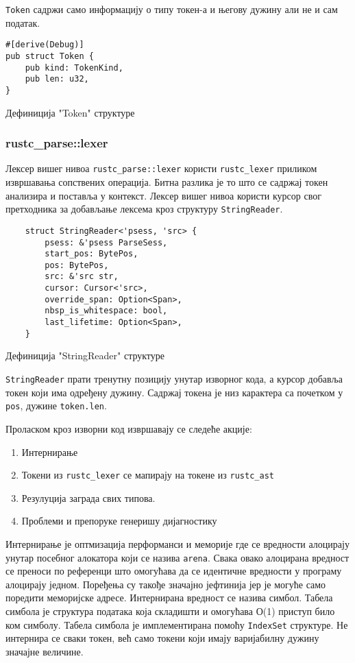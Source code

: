 \verb|Token| садржи само информацију о типу токен-а и његову дужину али не и 
сам податак.

\begin{listing}[H]
\begin{verbatim}
#[derive(Debug)]
pub struct Token {
    pub kind: TokenKind,
    pub len: u32,
}   
\end{verbatim}
\caption{Дефиниција "Token" структуре}
\end{listing}

\subsubsection{rustc\_parse::lexer}

Лексер вишег нивоа \verb|rustc_parse::lexer| користи \verb|rustc_lexer| приликом извршавања сопствених
операција. Битна разлика је то што се садржај токен анализира и поставља у контекст.
Лексер вишег нивоа користи курсор свог претходника за добављање лексема кроз структуру \verb|StringReader|. 

\begin{listing}[H]
\begin{verbatim}
    struct StringReader<'psess, 'src> {
        psess: &'psess ParseSess,
        start_pos: BytePos,
        pos: BytePos,
        src: &'src str,
        cursor: Cursor<'src>,
        override_span: Option<Span>,
        nbsp_is_whitespace: bool,
        last_lifetime: Option<Span>,
    }
\end{verbatim}
\caption{Дефиниција "StringReader" структуре}
\end{listing}

\verb|StringReader| прати тренутну позицију унутар изворног кода, а курсор 
добавља токен који има одређену дужину. Садржај токена је низ карактера са почетком у \verb|pos|,
дужине \verb|token.len|. 

Проласком кроз изворни код извршавају се следеће акције:
\begin{enumerate}
    \item Интернирање 
    \item Токени из \verb|rustc_lexer| се мапирају на токене из \verb|rustc_ast|
    \item Резулуција заграда свих типова.
    \item Проблеми и препоруке генеришу дијагностику 
\end{enumerate}

Интернирање је оптмизација перформанси и меморије где се вредности алоцирају унутар 
посебног алокатора који се назива \verb|arena|. Свака овако алоцирана вредност се преноси по 
референци што омогућава да се идентичне вредности у програму алоцирају једном. Поређења
су такође значајно јефтинија јер је могуће само поредити меморијске адресе. 
Интернирана вредност се назива симбол. Табела симбола је структура података
која складишти и омогућава О(1) приступ било ком симболу.  Табела симбола је имплементирана помоћу \verb|IndexSet|
структуре. Не интернира се сваки токен, већ само токени који имају варијабилну дужину значајне величине.

